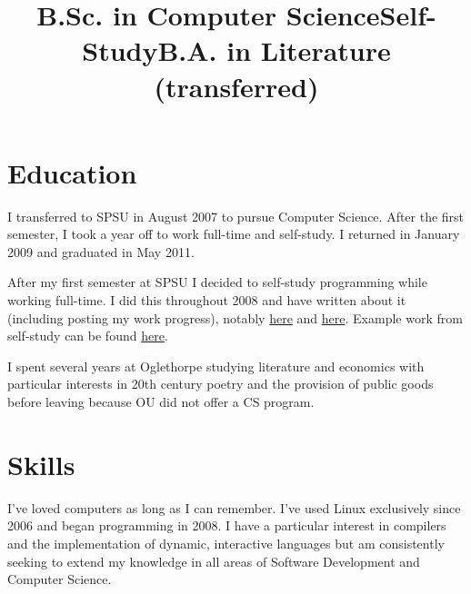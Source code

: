\documentclass[margintitle,line]{res}
\begin{document}
\begin{resume}

\section{Education}

\title{B.Sc. in Computer Science}
\begin{position}
  I transferred to SPSU in August 2007 to pursue Computer Science.
  After the first semester, I took a year off to work full-time and self-study.
  I returned in January 2009 and graduated in May 2011.
\end{position}

\title{Self-Study}
\begin{position}
  After my first semester at SPSU I decided to self-study
  programming while working full-time. I did this
  throughout 2008 and have written about it
  (including posting my work progress), notably
  \href{http://blog.redlinernotes.com/posts/Leaving-College-to-Leverage-Compulsion.html}{here} and
  \href{http://blog.redlinernotes.com/posts/Spring-2008-Schedule-and-Syllabus.html}{here}.
  Example work from self-study can be found
  \href{http://blog.redlinernotes.com/posts/SICP-Section-1.3.html}{here}.
\end{position}

\title{B.A. in Literature (transferred)}
\begin{position}
  I spent several years at Oglethorpe studying literature
  and economics with particular interests in 20th century
  poetry and the provision of public goods before leaving
  because OU did not offer a CS program.
\end{position}


\setlength{\parskip}{1ex}


\section{Skills}

I've loved computers as long as I can remember. I've used Linux exclusively
since 2006 and began programming in 2008. I have a particular interest in
compilers and the implementation of dynamic, interactive languages but am
consistently seeking to extend my knowledge in all areas of Software Development
and Computer Science.


\end{resume}
\end{document}

